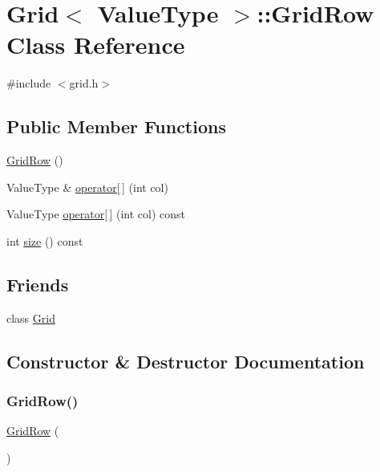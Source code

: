 \hypertarget{classGrid_1_1GridRow}{}\section{Grid$<$ Value\+Type $>$\+:\+:Grid\+Row Class Reference}
\label{classGrid_1_1GridRow}


{\ttfamily \#include $<$grid.\+h$>$}

\subsection*{Public Member Functions}
\begin{DoxyCompactItemize}
\item 
\mbox{\hyperlink{classGrid_1_1GridRow_aecbb8a1354a4b8ccf4764c1ba3d81896}{Grid\+Row}} ()
\item 
Value\+Type \& \mbox{\hyperlink{classGrid_1_1GridRow_a8bb588385a542bce972f4d3ce343744c}{operator\mbox{[}$\,$\mbox{]}}} (int col)
\item 
Value\+Type \mbox{\hyperlink{classGrid_1_1GridRow_afab07128e7554bce80de308f62fb07db}{operator\mbox{[}$\,$\mbox{]}}} (int col) const
\item 
int \mbox{\hyperlink{classGrid_1_1GridRow_af9593d4a5ff4274efaf429cb4f9e57cc}{size}} () const
\end{DoxyCompactItemize}
\subsection*{Friends}
\begin{DoxyCompactItemize}
\item 
class \mbox{\hyperlink{classGrid_1_1GridRow_a502b04f920610c0e574f2731a58681b4}{Grid}}
\end{DoxyCompactItemize}


\subsection{Constructor \& Destructor Documentation}
\mbox{\label{classGrid_1_1GridRow_aecbb8a1354a4b8ccf4764c1ba3d81896}} 
\subsubsection{\texorpdfstring{Grid\+Row()}{GridRow()}}
{\footnotesize\ttfamily \mbox{\hyperlink{classGrid_1_1GridRow}{Grid\+Row}} (\begin{DoxyParamCaption}{ }\end{DoxyParamCaption})\hspace{0.3cm}{\ttfamily [inline]}}



